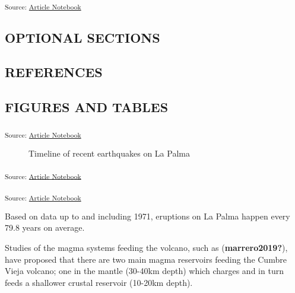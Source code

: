 \documentclass[
]{agujournal2019}
\begin{document}
\textsubscript{Source:
\href{https://rvcrawford.github.io/glowing-system/index-preview.html}{Article
Notebook}}

\subsection{OPTIONAL SECTIONS}\label{optional-sections}

\subsection{REFERENCES}\label{references}

\subsection{FIGURES AND TABLES}\label{figures-and-tables}

\textsubscript{Source:
\href{https://rvcrawford.github.io/glowing-system/index-preview.html}{Article
Notebook}}

\label{cell-fig-timeline}
\begin{figure}[H]


\caption{\label{fig-timeline}Timeline of recent earthquakes on La Palma}

\end{figure}%

\textsubscript{Source:
\href{https://rvcrawford.github.io/glowing-system/index-preview.html}{Article
Notebook}}

\textsubscript{Source:
\href{https://rvcrawford.github.io/glowing-system/index-preview.html}{Article
Notebook}}

Based on data up to and including 1971, eruptions on La Palma happen
every 79.8 years on average.

Studies of the magma systems feeding the volcano, such as
(\textbf{marrero2019?}), have proposed that there are two main magma
reservoirs feeding the Cumbre Vieja volcano; one in the mantle (30-40km
depth) which charges and in turn feeds a shallower crustal reservoir
(10-20km depth).
\end{document}
